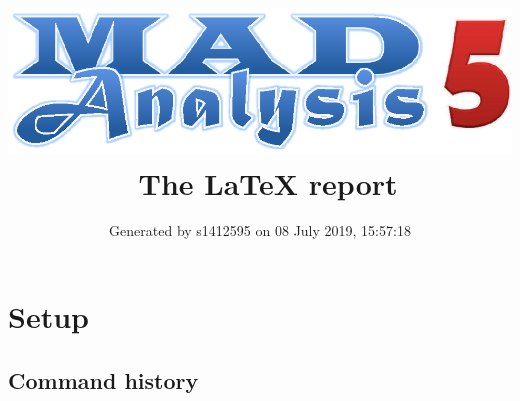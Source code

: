 \documentclass[a4paper, 10pt]{article}
\title{{\includegraphics[scale=.4]{logo.eps}}\ The LaTeX report}
\author{Generated by s1412595 on 08 July 2019, 15:57:18}
\begin{document}
\maketitle
\flushbottom

\newpage
\section{ Setup}

\subsection{ Command history}
\end{document}
